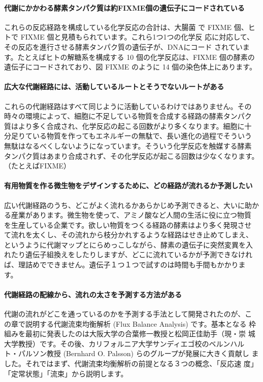 \paragraph{代謝にかかわる酵素タンパク質は約FIXME個の遺伝子にコードされている}
これらの反応経路を構成している化学反応の合計は、大腸菌
で FIXME 個、ヒトで FIXME 個と見積もられています。これら1つ1つの化学反
応に対応して、その反応を進行させる酵素タンパク質の遺伝子が、DNAにコード
されています。たとえばヒトの解糖系を構成する 10 個の化学反応は、FIXME 個の酵素の遺伝子にコードされており、図 FIXME のように 14 個の染色体上にあります。

%


\paragraph{広大な代謝経路には、活動しているルートとそうでないルートがある}
これらの代謝経路はすべて同じように活動しているわけではありません。その
時々の環境によって、細胞に不足している物質を合成する経路の酵素タンパク
質はより多く合成され、化学反応の起こる回数がより多くなります。細胞に十
分足りている物質を作ってもエネルギーの無駄で、長い進化の過程でそういう
無駄はなるべくしないようになっています。そういう化学反応を触媒する酵素
タンパク質はあまり合成されず、その化学反応が起こる回数は少なくなります。
（たとえばFIXME）

\paragraph{有用物質を作る微生物をデザインするために、どの経路が流れるか予測したい}
広い代謝経路のうち、どこがよく流れるかあらかじめ予測できると、大いに助か
る産業があります。微生物を使って、アミノ酸など人間の生活に役に立つ物質
を生産している企業です。欲しい物質をつくる経路の酵素はより多く発現させ
て流れを太くし、その流れから枝分かれするような経路はせき止めてしまえ、
というように代謝マップとにらめっこしながら、酵素の遺伝子に突然変異を入
れたり遺伝子組換えをしたりしますが、どこに流れているかが予測できなけれ
ば、理詰めでできません。遺伝子１つ１つで試すのは時間も手間もかかりま
す。

\paragraph{代謝経路の配線から、流れの太さを予測する方法がある}
代謝の流れがどこを通っているのかを予測する手法として開発されたのが、こ
の章で説明する代謝流束均衡解析 (Flux Balance Analysis) です。基本となる
枠組みを最初に発表したのは大阪大学の合葉修一教授と松岡正佳助手（現・崇
城大学教授）です。その後、カリフォルニア大学サンディエゴ校のベルンハル
ト・パルソン教授 (Bernhard O. Palsson) らのグループが発展に大きく貢献し
ました。それではまず、代謝流束均衡解析の前提となる３つの概念、「反応速
度」「定常状態」「流束」から説明します。

